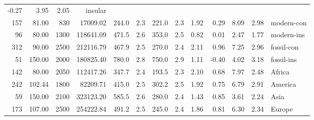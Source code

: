\begin{landscape}
\begin{longtable}[]{@{}rrrrrrrrrrrrl@{}}
	-0.27 & 3.95 & 2.05 & insular\tabularnewline
	157 & 81.00 & 830 & 17009.02 & 244.0 & 2.3 & 221.0 & 2.3 & 1.92 & 0.29 &
	8.09 & 2.98 & modern-con\tabularnewline
	96 & 80.00 & 1300 & 118641.09 & 471.5 & 2.6 & 353.0 & 2.5 & 0.82 & 0.01
	& 2.47 & 1.77 & modern-ins\tabularnewline
	312 & 90.00 & 2500 & 212116.79 & 467.9 & 2.5 & 270.0 & 2.4 & 2.11 & 0.96
	& 7.25 & 2.96 & fossil-con\tabularnewline
	51 & 150.00 & 2000 & 180825.40 & 780.0 & 2.8 & 750.0 & 2.9 & 1.11 &
	-0.40 & 4.02 & 3.18 & fossil-ins\tabularnewline
	142 & 80.00 & 2050 & 112417.26 & 347.7 & 2.4 & 193.5 & 2.3 & 2.10 & 0.68
	& 7.97 & 2.48 & Africa\tabularnewline
	242 & 102.44 & 1800 & 82209.71 & 415.0 & 2.5 & 302.2 & 2.5 & 1.92 & 0.75
	& 6.79 & 2.91 & America\tabularnewline
	59 & 150.00 & 2100 & 323123.20 & 585.5 & 2.6 & 280.0 & 2.4 & 1.43 & 0.85
	& 3.61 & 2.24 & Asia\tabularnewline
	173 & 107.00 & 2500 & 254222.84 & 491.2 & 2.5 & 245.0 & 2.4 & 1.86 &
	0.81 & 6.30 & 2.34 & Europe\tabularnewline
	\bottomrule
\end{longtable}
\end{landscape}